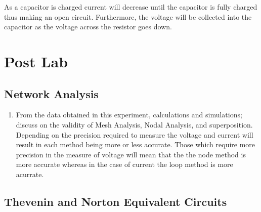 \documentclass[a4paper]{article}
\begin{document}
As a capacitor is charged current will decrease until the capacitor is fully charged thus making an open circuit. Furthermore, the voltage will be collected into the capacitor as the voltage across the resistor goes down.

\pagebreak
\section{Post Lab}

\subsection{Network Analysis}

\begin{enumerate}
    \item From the data obtained in this experiment, calculations and simulations; discuss on the validity of Mesh Analysis, Nodal Analysis, and superposition.\\
    Depending on the precision required to measure the voltage and current will result in each method being more or less accurate. Those which require more precision in the measure of voltage will mean that the 
    the node method is more accurate whereas in the case of current the loop method is more acurrate.
\end{enumerate}
    

\subsection{Thevenin and Norton Equivalent Circuits}
\end{document}
